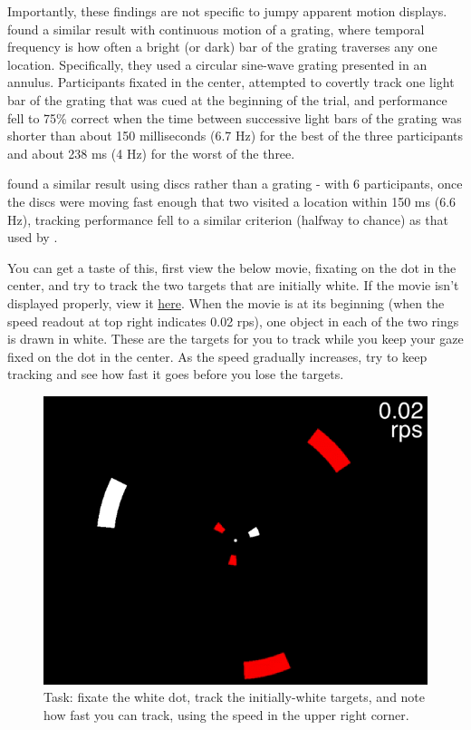 \documentclass[
]{book}
\begin{document}
Importantly, these findings are not specific to jumpy apparent motion displays. \citet{verstratenLimitsAttentiveTracking2000} found a similar result with continuous motion of a grating, where temporal frequency is how often a bright (or dark) bar of the grating traverses any one location. Specifically, they used a circular sine-wave grating presented in an annulus. Participants fixated in the center, attempted to covertly track one light bar of the grating that was cued at the beginning of the trial, and performance fell to 75\% correct when the time between successive light bars of the grating was shorter than about 150 milliseconds (6.7 Hz) for the best of the three participants and about 238 ms (4 Hz) for the worst of the three.

\citet{holcombeSplittingAttentionReduces2013} found a similar result using discs rather than a grating - with 6 participants, once the discs were moving fast enough that two visited a location within 150 ms (6.6 Hz), tracking performance fell to a similar criterion (halfway to chance) as that used by \citet{verstratenLimitsAttentiveTracking2000}.

You can get a taste of this, first view the below movie, fixating on the dot in the center, and try to track the two targets that are initially white. If the movie isn't displayed properly, view it \href{movies/MOTmovies/temporalLimits/2targets3objectsPerArray.gif}{here}.
When the movie is at its beginning (when the speed readout at top right indicates 0.02 rps), one object in each of the two rings is drawn in white. These are the targets for you to track while you keep your gaze fixed on the dot in the center. As the speed gradually increases, try to keep tracking and see how fast it goes before you lose the targets.

\begin{figure}
\includegraphics[width=1\linewidth]{movies/MOTmovies/temporalLimits/static_2targets3objectsPerArray} \caption{Task: fixate the white dot, track the initially-white targets, and note how fast you can track, using the speed in the upper right corner.}\label{fig:unnamed-chunk-10}
\end{figure}
\end{document}
